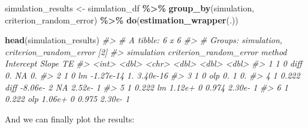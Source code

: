 \documentclass[
]{book}
\newenvironment{Shaded}{\begin{snugshade}}{\end{snugshade}}
\newcommand{\CommentTok}[1]{\textcolor[rgb]{0.56,0.35,0.01}{\textit{#1}}}
\newcommand{\KeywordTok}[1]{\textcolor[rgb]{0.13,0.29,0.53}{\textbf{#1}}}
\newcommand{\NormalTok}[1]{#1}
\newcommand{\OperatorTok}[1]{\textcolor[rgb]{0.81,0.36,0.00}{\textbf{#1}}}
\newcommand{\StringTok}[1]{\textcolor[rgb]{0.31,0.60,0.02}{#1}}
\begin{document}
\begin{Shaded}
\begin{Highlighting}[]
\NormalTok{simulation\_results <{-}}\StringTok{ }\NormalTok{simulation\_df }\OperatorTok{\%>\%}
\StringTok{  }\KeywordTok{group\_by}\NormalTok{(simulation, criterion\_random\_error) }\OperatorTok{\%>\%}
\StringTok{  }\KeywordTok{do}\NormalTok{(}\KeywordTok{estimation\_wrapper}\NormalTok{(.))}


\KeywordTok{head}\NormalTok{(simulation\_results)}
\CommentTok{\#> \# A tibble: 6 x 6}
\CommentTok{\#> \# Groups:   simulation, criterion\_random\_error [2]}
\CommentTok{\#>   simulation criterion\_random\_error method Intercept  Slope       TE}
\CommentTok{\#>        <int>                  <dbl> <chr>      <dbl>  <dbl>    <dbl>}
\CommentTok{\#> 1          1                  0     diff    0.       NA     0.      }
\CommentTok{\#> 2          1                  0     lm     {-}1.27e{-}14  1.    3.40e{-}16}
\CommentTok{\#> 3          1                  0     olp     0.        1     0.      }
\CommentTok{\#> 4          1                  0.222 diff   {-}8.06e{-} 2 NA     2.52e{-} 1}
\CommentTok{\#> 5          1                  0.222 lm      1.12e+ 0  0.974 2.30e{-} 1}
\CommentTok{\#> 6          1                  0.222 olp     1.06e+ 0  0.975 2.30e{-} 1}
\end{Highlighting}
\end{Shaded}

And we can finally plot the results:
\end{document}
